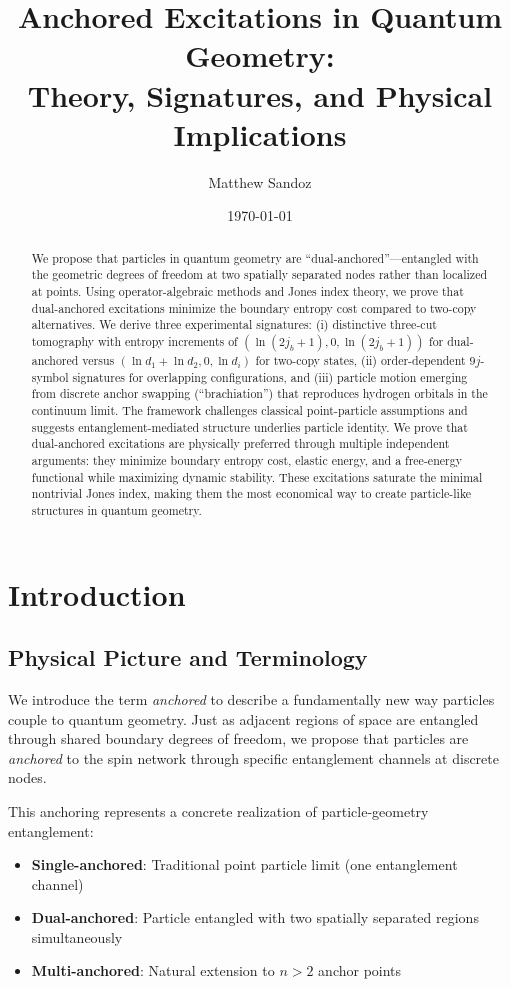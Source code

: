 \documentclass[11pt]{article}
\title{Anchored Excitations in Quantum Geometry: \\ Theory, Signatures, and Physical Implications}
\author{Matthew Sandoz}
\date{\today}
\theoremstyle{plain}
\theoremstyle{definition}
\begin{document}
\pagestyle{plain}
\maketitle

\begin{abstract}
  We propose that particles in quantum geometry are ``dual-anchored''---entangled with the geometric degrees of freedom at
  two spatially separated nodes rather than localized at points. Using operator-algebraic methods and Jones index theory,
  we prove that dual-anchored excitations minimize the boundary entropy cost compared to two-copy alternatives. We derive
  three experimental signatures: (i) distinctive three-cut tomography with entropy increments of $(\ln(2j_b+1), 0, \ln(2j_b+1))$
  for dual-anchored versus $(\ln d_1 + \ln d_2, 0, \ln d_i)$ for two-copy states, (ii) order-dependent $9j$-symbol signatures
  for overlapping configurations, and (iii) particle motion emerging from discrete anchor swapping (``brachiation'') that
  reproduces hydrogen orbitals in the continuum limit. The framework challenges classical point-particle assumptions and
  suggests entanglement-mediated structure underlies particle identity.
  We prove that dual-anchored excitations are physically preferred through multiple independent arguments: they minimize
  boundary entropy cost, elastic energy, and a free-energy functional while maximizing dynamic stability. These excitations
  saturate the minimal nontrivial Jones index, making them the most economical way to create particle-like structures in
  quantum geometry.
\end{abstract}

\section{Introduction}
\label{sec:intro}

\subsection{Physical Picture and Terminology}

We introduce the term \emph{anchored} to describe a fundamentally new way particles couple to quantum geometry. Just as adjacent regions of space are entangled through shared boundary degrees of freedom, we propose that particles are \emph{anchored} to the spin network through specific entanglement channels at discrete nodes.

This anchoring represents a concrete realization of particle-geometry entanglement:
\begin{itemize}
  \item \textbf{Single-anchored}: Traditional point particle limit (one entanglement channel)
  \item \textbf{Dual-anchored}: Particle entangled with two spatially separated regions simultaneously
  \item \textbf{Multi-anchored}: Natural extension to $n > 2$ anchor points
\end{itemize}
\end{document}
